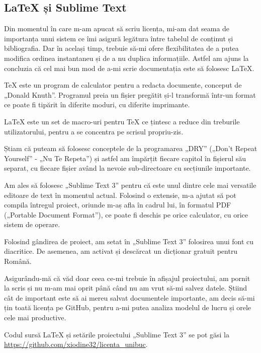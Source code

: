 	\subsection{LaTeX și Sublime Text}

	Din momentul în care m-am apucat să scriu licența, mi-am dat seama de importanța unui sistem ce îmi asigură legătura între tabelul de conținut și bibliografia.
	Dar în același timp, trebuie să-mi ofere flexibilitatea de a putea modifica ordinea instantaneu și de a nu duplica informațiile.
	Astfel am ajuns la concluzia că cel mai bun mod de a-mi scrie documentația este să folosesc \LaTeX.

	TeX este un program de calculator pentru a redacta documente, conceput de „Donald Knuth”.
	Programul preia un fișier pregătit și-l transformă într-un format ce poate fi tipărit în diferite moduri, cu diferite imprimante.

	LaTeX este un set de macro-uri pentru TeX ce țintesc a reduce din treburile utilizatorului, pentru a se concentra pe scrisul propriu-zis. \cite{latex}

	Știam că puteam să folosesc conceptele de la programarea „DRY” („Don't Repeat Yourself” - „Nu Te Repeta”) și astfel am împărțit fiecare capitol în fișierul său separat, cu fiecare fișier având la nevoie sub-directoare cu secțiunile importante.

	Am ales să folosesc „Sublime Text 3” pentru că este unul dintre cele mai versatile editoare de text în momentul actual.
	Folosind o extensie, m-a  ajutat să pot compila întregul proiect, oriunde m-aș afla în cadrul lui, în formatul PDF („Portable Document Format”), ce poate fi deschis pe orice calculator, cu orice sistem de operare.

	Folosind gândirea de proiect, am setat în „Sublime Text 3” folosirea unui font cu diacritice. De asemenea, am activat și descărcat un dicționar gratuit pentru Română.

	Asigurându-mă că văd doar ceea ce-mi trebuie în afișajul proiectului, am pornit la scris și nu m-am mai oprit până când nu am vrut să-mi salvez datele.
	Știind cât de important este să ai mereu salvat documentele importante, am decis să-mi țin toată licența pe GitHub, pentru a-mi putea analiza modelul de lucru și orele cele mai productive.

	Codul sursă \LaTeX \hspace{1pt} și setările proiectului „Sublime Text 3” se pot găsi la \url{https://github.com/xiodine32/licenta_unibuc}.
